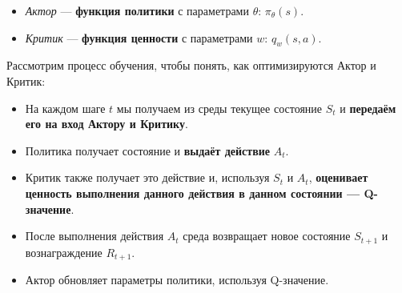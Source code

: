 \documentclass[11pt,a4paper]{article}
\begin{document}
\begin{itemize}
\tightlist
\item
  \emph{Актор} --- \textbf{функция политики} с параметрами \(\theta\): \(\pi_{\theta}(s)\).
\item
  \emph{Критик} --- \textbf{функция ценности} с параметрами \(w\): \(\hat{q}_{w}(s,a)\).
\end{itemize}

Рассмотрим процесс обучения, чтобы понять, как оптимизируются Актор и Критик:

\begin{itemize}
\item
  На каждом шаге \(t\) мы получаем из среды текущее состояние \(S_t\) и \textbf{передаём его на вход Актору и Критику}.
\item
  Политика получает состояние и \textbf{выдаёт действие} \(A_t\).
\end{itemize}


\begin{itemize}
\tightlist
\item
  Критик также получает это действие и, используя \(S_t\) и \(A_t\), \textbf{оценивает ценность выполнения данного действия в данном состоянии --- Q-значение}.
\end{itemize}


\begin{itemize}
\tightlist
\item
  После выполнения действия \(A_t\) среда возвращает новое состояние \(S_{t+1}\) и вознаграждение \(R_{t+1}\).
\end{itemize}


\begin{itemize}
\tightlist
\item
  Актор обновляет параметры политики, используя Q-значение.
\end{itemize}
\end{document}
